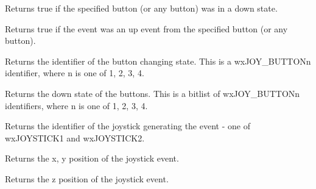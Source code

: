 
Returns true if the specified button (or any button) was in a down state.



\label{wxjoystickeventbuttonup}


Returns true if the event was an up event from the specified button (or any button).



\label{wxjoystickeventgetbuttonchange}


Returns the identifier of the button changing state. This is a wxJOY\_BUTTONn identifier, where
n is one of 1, 2, 3, 4.

\label{wxjoystickeventgetbuttonstate}


Returns the down state of the buttons. This is a bitlist of wxJOY\_BUTTONn identifiers, where
n is one of 1, 2, 3, 4.

\label{wxjoystickeventgetjoystick}


Returns the identifier of the joystick generating the event - one of wxJOYSTICK1 and wxJOYSTICK2.

\label{wxjoystickeventgetposition}


Returns the x, y position of the joystick event.

\label{wxjoystickeventgetzposition}


Returns the z position of the joystick event.


